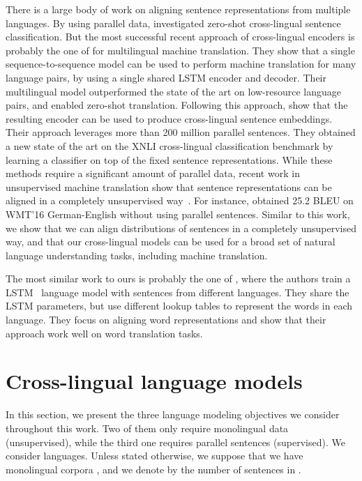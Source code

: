\documentclass[11pt,a4paper]{article}
\begin{document}
There is a large body of work on aligning sentence representations from multiple languages. By using parallel data, \citet{hermann2014multilingual,conneau2018xnli,eriguchi2018zero} investigated zero-shot cross-lingual sentence classification. But the most successful recent approach of cross-lingual encoders is probably the one of \citet{johnson2017google} for multilingual machine translation. They show that a single sequence-to-sequence model can be used to perform machine translation for many language pairs, by using a single shared LSTM encoder and decoder. Their multilingual model outperformed the state of the art on low-resource language pairs, and enabled zero-shot translation. Following this approach, \citet{artetxe2018massively} show that the resulting encoder can be used to produce cross-lingual sentence embeddings. Their approach leverages more than 200 million parallel sentences. They obtained a new state of the art on the XNLI cross-lingual classification benchmark \cite{conneau2018xnli} by learning a classifier on top of the fixed sentence representations.
While these methods require a significant amount of parallel data, recent work in unsupervised machine translation show that sentence representations can be aligned in a completely unsupervised way~\cite{unsupNMTlample,unsupNMTartetxe}. For instance, \citet{lample2018phrase} obtained 25.2 BLEU on WMT'16 German-English without using parallel sentences. Similar to this work, we show that we can align distributions of sentences in a completely unsupervised way, and that our cross-lingual models can be used for a broad set of natural language understanding tasks, including machine translation.

The most similar work to ours is probably the one of \citet{wada2018unsupervised}, where the authors train a LSTM~\cite{hochreiter1997long} language model with sentences from different languages. They share the LSTM parameters, but use different lookup tables to represent the words in each language. They focus on aligning word representations and show that their approach work well on word translation tasks.

\section{Cross-lingual language models}
\label{sect:model}

In this section, we present the three language modeling objectives we consider throughout this work. Two of them only require monolingual data (unsupervised), while the third one requires parallel sentences (supervised). We consider  languages. Unless stated otherwise, we suppose that we have  monolingual corpora , and we denote by  the number of sentences in .
\end{document}
